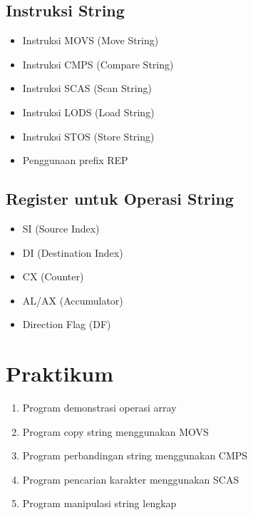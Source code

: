 \subsection{Instruksi String}
\begin{itemize}
\item Instruksi MOVS (Move String)
\item Instruksi CMPS (Compare String)
\item Instruksi SCAS (Scan String)
\item Instruksi LODS (Load String)
\item Instruksi STOS (Store String)
\item Penggunaan prefix REP
\end{itemize}

\subsection{Register untuk Operasi String}
\begin{itemize}
\item SI (Source Index)
\item DI (Destination Index)
\item CX (Counter)
\item AL/AX (Accumulator)
\item Direction Flag (DF)
\end{itemize}

\section{Praktikum}
\begin{enumerate}
\item Program demonstrasi operasi array
\item Program copy string menggunakan MOVS
\item Program perbandingan string menggunakan CMPS
\item Program pencarian karakter menggunakan SCAS
\item Program manipulasi string lengkap
\end{enumerate}

